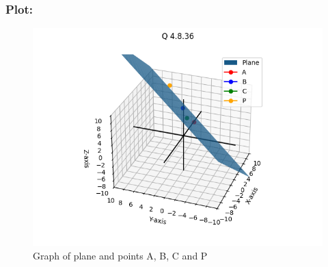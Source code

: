 \documentclass{beamer}
\begin{document}
\begin{frame}
    \frametitle{Plot: }
    \begin{figure}[h!]
        \centering
        \includegraphics[width=0.9\columnwidth]{../figs/plot.png}
        \caption{Graph of plane and points A, B, C and P}
        \label{fig:4.2.3}
    \end{figure}
\end{frame}
\end{document}

